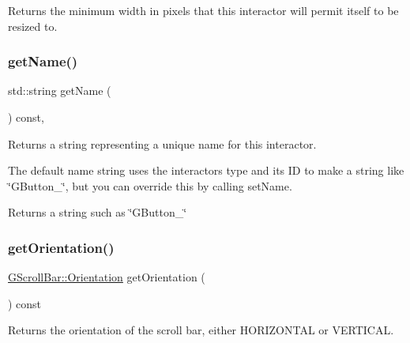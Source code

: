 Returns the minimum width in pixels that this interactor will permit itself to be resized to. 

\mbox{\label{classGInteractor_a8a60438a5b55d0b2ceb35c8674b9d8c5}} 
\subsubsection{\texorpdfstring{get\+Name()}{getName()}}
{\footnotesize\ttfamily std\+::string get\+Name (\begin{DoxyParamCaption}{ }\end{DoxyParamCaption}) const\hspace{0.3cm}{\ttfamily [virtual]}, {\ttfamily [inherited]}}



Returns a string representing a unique name for this interactor. 

The default name string uses the interactor\textquotesingle{}s type and its ID to make a string like \char`\"{}\+G\+Button\+\_\char`\"{}, but you can override this by calling set\+Name. \begin{DoxyReturn}{Returns}
a string such as \char`\"{}\+G\+Button\+\_\char`\"{} 
\end{DoxyReturn}
\mbox{\label{classGScrollBar_a816fab656ead9b4f927bff46ae5a0e4d}} 
\subsubsection{\texorpdfstring{get\+Orientation()}{getOrientation()}}
{\footnotesize\ttfamily \mbox{\hyperlink{classGScrollBar_a871118a09520247c78a71ecd7b0abd58}{G\+Scroll\+Bar\+::\+Orientation}} get\+Orientation (\begin{DoxyParamCaption}{ }\end{DoxyParamCaption}) const\hspace{0.3cm}{\ttfamily [virtual]}}



Returns the orientation of the scroll bar, either H\+O\+R\+I\+Z\+O\+N\+T\+AL or V\+E\+R\+T\+I\+C\+AL. 

\mbox{\label{classGInteractor_a747de0961653847bdc6615dbf756d715}} 
